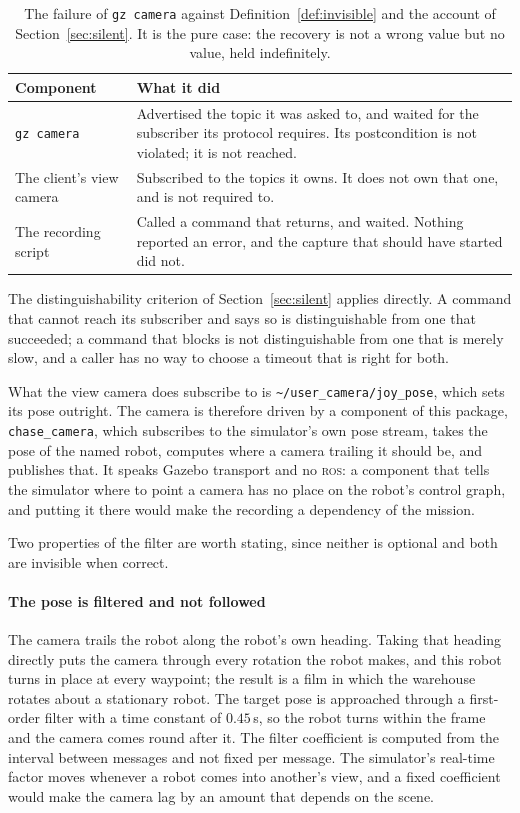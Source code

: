\documentclass[11pt,a4paper]{article}
\theoremstyle{definition}
\newcommand{\code}[1]{\texttt{\small #1}}
\begin{document}
\begin{table}[H]
\centering\small
\caption{The failure of \code{gz camera} against
Definition~\ref{def:invisible} and the account of
Section~\ref{sec:silent}. It is the pure case: the recovery is not a wrong
value but no value, held indefinitely.}
\label{tab:gzcamera}
\begin{tabularx}{\textwidth}{@{}p{}X@{}}
\toprule
\textbf{Component} & \textbf{What it did} \\
\midrule
\code{gz camera} &
Advertised the topic it was asked to, and waited for the subscriber its
protocol requires. Its postcondition is not violated; it is not reached. \\
\addlinespace
The client's view camera &
Subscribed to the topics it owns. It does not own that one, and is not
required to. \\
\addlinespace
The recording script &
Called a command that returns, and waited. Nothing reported an error, and the
capture that should have started did not. \\
\bottomrule
\end{tabularx}
\end{table}

The distinguishability criterion of Section~\ref{sec:silent} applies directly.
A command that cannot reach its subscriber and says so is distinguishable from
one that succeeded; a command that blocks is not distinguishable from one that
is merely slow, and a caller has no way to choose a timeout that is right for
both.

What the view camera does subscribe to is
\code{\textasciitilde/user\_camera/joy\_pose}, which sets its pose outright.
The camera is therefore driven by a component of this package,
\code{chase\_camera}, which subscribes to the simulator's own pose stream,
takes the pose of the named robot, computes where a camera trailing it should
be, and publishes that. It speaks Gazebo transport and no \textsc{ros}: a
component that tells the simulator where to point a camera has no place on the
robot's control graph, and putting it there would make the recording a
dependency of the mission.

Two properties of the filter are worth stating, since neither is optional and
both are invisible when correct.

\paragraph{The pose is filtered and not followed} The camera trails the robot
along the robot's own heading. Taking that heading directly puts the camera
through every rotation the robot makes, and this robot turns in place at every
waypoint; the result is a film in which the warehouse rotates about a
stationary robot. The target pose is approached through a first-order filter
with a time constant of $0.45$\,s, so the robot turns within the frame and the
camera comes round after it. The filter coefficient is computed from the
interval between messages and not fixed per message. The simulator's
real-time factor moves whenever a robot comes into another's view, and a fixed
coefficient would make the camera lag by an amount that depends on the
scene.
\end{document}
